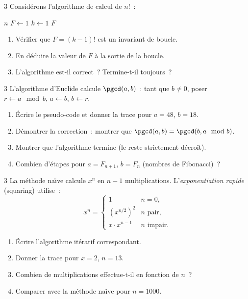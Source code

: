 \begin{exo}{3}
Consid\'erons l'algorithme de calcul de $n!$~:
\begin{algorithm}[H]
\caption{Calcul it\'eratif de $n!$}
\Lire $n$\;
$F \leftarrow 1$\;
$k \leftarrow 1$\;
\Afficher $F$\;
\end{algorithm}
\begin{enumerate}
  \item V\'erifier que $F = (k-1)!$ est un invariant de boucle.
  \item En d\'eduire la valeur de $F$ \`a la sortie de la boucle.
  \item L'algorithme est-il correct~? Termine-t-il toujours~?
\end{enumerate}
\end{exo}

\begin{exo}{3}
L'algorithme d'Euclide calcule $\pgcd(a,b)$~:
tant que $b \ne 0$, poser $r \leftarrow a \mod b$, $a \leftarrow b$, $b \leftarrow r$.
\begin{enumerate}
  \item \'Ecrire le pseudo-code et donner la trace pour $a=48$, $b=18$.
  \item D\'emontrer la correction~: montrer que $\pgcd(a,b) = \pgcd(b, a\mod b)$.
  \item Montrer que l'algorithme termine (le reste strictement d\'ecro\^it).
  \item Combien d'\'etapes pour $a=F_{n+1}$, $b=F_n$ (nombres de Fibonacci)~?
\end{enumerate}
\end{exo}

\begin{exo}{3}
La m\'ethode na\"\i ve calcule $x^n$ en $n-1$ multiplications.
L'\emph{exponentiation rapide} (squaring) utilise~:
\[ x^n = \begin{cases} 1 & n=0, \\ (x^{n/2})^2 & n \text{ pair,} \\ x \cdot x^{n-1} & n \text{ impair.}\end{cases} \]
\begin{enumerate}
  \item \'Ecrire l'algorithme it\'eratif correspondant.
  \item Donner la trace pour $x=2$, $n=13$.
  \item Combien de multiplications effectue-t-il en fonction de $n$~?
  \item Comparer avec la m\'ethode na\"\i ve pour $n=1000$.
\end{enumerate}
\end{exo}

